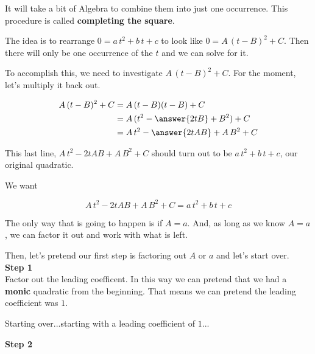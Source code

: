 \documentclass{ximera}
\begin{document}
It will take a bit of Algebra to combine them into just one occurrence. This procedure is called \textbf{completing the square}. \\



\begin{idea}


The idea is to rearrange  $0 = a \, t^2 + b \, t + c$ to look like $0 = A \, (t-B)^2 + C$.  Then there will only be  one occurrence of the $t$ and we can solve for it.


To accomplish this, we need to investigate $A \, (t-B)^2 + C$. For the moment, let's multiply it back out.


\begin{align*}
A \, (t-B)^2 + C & = A \, (t-B)(t-B) + C \\
& = A \, (t^2 - \answer{2 t B} + B^2) + C  \\
& = A \, t^2 - \answer{2 t A B} + A \, B^2 + C
\end{align*}

This last line, $A \, t^2 - 2 t A B + A \, B^2 + C$ should turn out to be $a \, t^2 + b \, t + c$, our original quadratic.

\end{idea}






We want


\[ A \, t^2 - 2 t A B + A \, B^2 + C = a \, t^2 + b \, t + c \]



The only way that is going to happen is if $A = a$. And, as long as we know $A = a$, we can factor it out and work with what is left.

Then, let's pretend our first step is factoring out $A$ or $a$ and let's start over. \\






\textbf{\textcolor{blue!75!black}{Step 1}} \\

 Factor out the leading coefficent.   In this way we can pretend that we had a \textbf{monic} quadratic from the beginning.  That means we can pretend the leading coefficient was $1$.


Starting over...starting with a leading coefficient of $1$...


\textbf{\textcolor{blue!75!black}{Step 2}} \\
\end{document}
